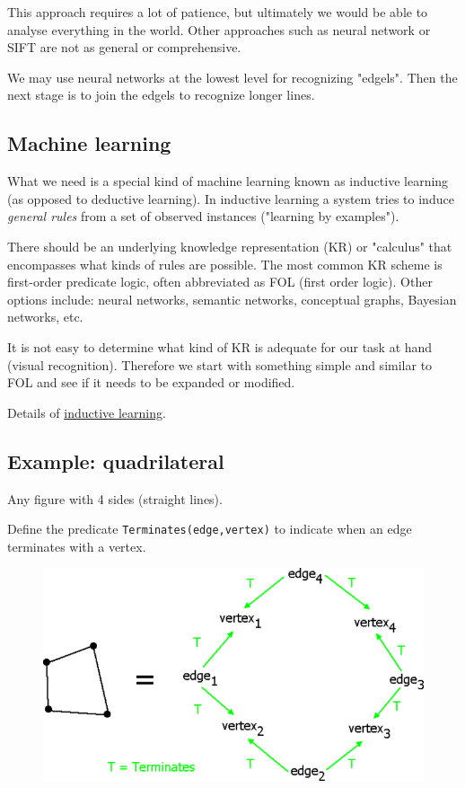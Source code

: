 This approach requires a lot of patience, but ultimately we would be able to analyse everything in the world. Other approaches such as neural network or SIFT are not as general or comprehensive.

We may use neural networks at the lowest level for recognizing "edgels". Then the next stage is to join the edgels to recognize longer lines.

\subsection{Machine learning}

What we need is a special kind of machine learning known as inductive learning (as opposed to deductive learning). In inductive learning a system tries to induce \emph{general rules} from a set of observed instances ("learning by examples").

There should be an underlying knowledge representation (KR) or  "calculus" that encompasses what kinds of rules are possible. The most common KR scheme is first-order predicate logic, often abbreviated as FOL (first order logic). Other options include: neural networks, semantic networks, conceptual graphs, Bayesian networks, etc.

It is not easy to determine what kind of KR is adequate for our task at hand (visual recognition). Therefore we start with something simple and similar to FOL and see if it needs to be expanded or modified.

Details of \href{Vis-InductiveLearning.htm}{inductive learning}. 

\subsection{Example: quadrilateral}

Any figure with 4 sides (straight lines).

Define the predicate \texttt{Terminates(edge,vertex)}  to indicate when an edge terminates with a vertex.

\begin{figure}[H]
\centering
\includegraphics[scale=0.6]{Quadrilateral.png}
\end{figure}

